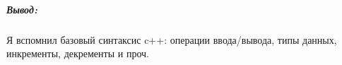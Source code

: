 \subparagraph{Вывод:}
Я вспомнил базовый синтаксис c++: операции ввода/вывода, типы данных, инкременты, декременты и проч.